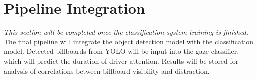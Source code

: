 \section{Pipeline Integration}\label{ch:pipelineintegration}

\textit{This section will be completed once the classification system training is finished.}\\

The final pipeline will integrate the object detection model with the classification model. Detected billboards from YOLO will be input into the gaze classifier, which will predict the duration of driver attention. Results will be stored for analysis of correlations between billboard visibility and distraction.
